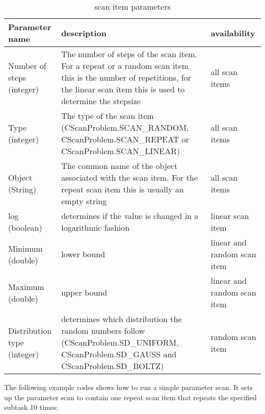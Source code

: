 \documentclass[a4,10pt]{article}
\begin{document}
\begin{table}[ht]
\begin{tabularx}{\textwidth}[t]{m{}|m{}|m{}}
Parameter name & description & availability\\ \hline \hline 
Number of steps (integer) & The number of steps of the scan item. For a repeat or a random scan item this is the number of repetitions, for the linear scan item this is used to determine the stepsize & all scan items\\ \hline
Type (integer) & The type of the scan item (CScanProblem.SCAN\_RANDOM, CScanProblem.SCAN\_REPEAT or CScanProblem.SCAN\_LINEAR) & all scan items\\ \hline
Object (String) & The common name of the object associated with the scan item. For the repeat scan item this is usually an empty string & all scan items\\ \hline
log (boolean) & determines if the value is changed in a logarithmic fashion & linear scan item\\ \hline
Minimum (double) & lower bound & linear and random scan item\\ \hline
Maximum (double) & upper bound &  linear and random scan item\\ \hline
Distribution type (integer) & determines which distribution the random numbers follow (CScanProblem.SD\_UNIFORM, CScanProblem.SD\_GAUSS and CScanProblem.SD\_BOLTZ) & random scan item\\ \hline
\end{tabularx}
\label{ScanItemParameters}
\caption{scan item parameters}
\end{table}

The following example codes shows how to run a simple parameter scan. It sets up the parameter scan to contain one repeat scan item that repeats the specified subtask 10 times:
\end{document}
